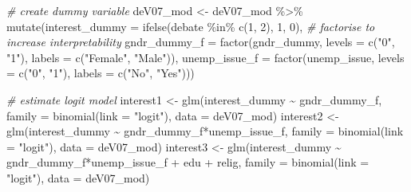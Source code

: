 \documentclass[
]{article}
\newenvironment{Shaded}{\begin{snugshade}}{\end{snugshade}}
\newcommand{\AttributeTok}[1]{\textcolor[rgb]{0.77,0.63,0.00}{#1}}
\newcommand{\CommentTok}[1]{\textcolor[rgb]{0.56,0.35,0.01}{\textit{#1}}}
\newcommand{\DecValTok}[1]{\textcolor[rgb]{0.00,0.00,0.81}{#1}}
\newcommand{\FunctionTok}[1]{\textcolor[rgb]{0.00,0.00,0.00}{#1}}
\newcommand{\NormalTok}[1]{#1}
\newcommand{\OtherTok}[1]{\textcolor[rgb]{0.56,0.35,0.01}{#1}}
\newcommand{\SpecialCharTok}[1]{\textcolor[rgb]{0.00,0.00,0.00}{#1}}
\newcommand{\StringTok}[1]{\textcolor[rgb]{0.31,0.60,0.02}{#1}}
\begin{document}
\begin{Shaded}
\begin{Highlighting}[]
\CommentTok{\# create dummy variable }
\NormalTok{deV07\_mod }\OtherTok{\textless{}{-}}\NormalTok{ deV07\_mod }\SpecialCharTok{\%\textgreater{}\%}
  \FunctionTok{mutate}\NormalTok{(}\AttributeTok{interest\_dummy =} \FunctionTok{ifelse}\NormalTok{(debate }\SpecialCharTok{\%in\%} \FunctionTok{c}\NormalTok{(}\DecValTok{1}\NormalTok{, }\DecValTok{2}\NormalTok{), }\DecValTok{1}\NormalTok{, }\DecValTok{0}\NormalTok{),}
         \CommentTok{\# factorise to increase interpretability}
         \AttributeTok{gndr\_dummy\_f =} \FunctionTok{factor}\NormalTok{(gndr\_dummy, }
                               \AttributeTok{levels =} \FunctionTok{c}\NormalTok{(}\StringTok{"0"}\NormalTok{, }\StringTok{"1"}\NormalTok{), }
                               \AttributeTok{labels =} \FunctionTok{c}\NormalTok{(}\StringTok{"Female"}\NormalTok{, }\StringTok{"Male"}\NormalTok{)), }
         \AttributeTok{unemp\_issue\_f =} \FunctionTok{factor}\NormalTok{(unemp\_issue,}
                               \AttributeTok{levels =} \FunctionTok{c}\NormalTok{(}\StringTok{"0"}\NormalTok{, }\StringTok{"1"}\NormalTok{), }
                               \AttributeTok{labels =} \FunctionTok{c}\NormalTok{(}\StringTok{"No"}\NormalTok{, }\StringTok{"Yes"}\NormalTok{)))}

\CommentTok{\# estimate logit model }
\NormalTok{interest1 }\OtherTok{\textless{}{-}} \FunctionTok{glm}\NormalTok{(interest\_dummy }\SpecialCharTok{\textasciitilde{}}\NormalTok{ gndr\_dummy\_f, }
                 \AttributeTok{family =} \FunctionTok{binomial}\NormalTok{(}\AttributeTok{link =} \StringTok{"logit"}\NormalTok{), }
                 \AttributeTok{data =}\NormalTok{ deV07\_mod)}
\NormalTok{interest2 }\OtherTok{\textless{}{-}} \FunctionTok{glm}\NormalTok{(interest\_dummy }\SpecialCharTok{\textasciitilde{}}\NormalTok{ gndr\_dummy\_f}\SpecialCharTok{*}\NormalTok{unemp\_issue\_f, }
                 \AttributeTok{family =} \FunctionTok{binomial}\NormalTok{(}\AttributeTok{link =} \StringTok{"logit"}\NormalTok{), }
                 \AttributeTok{data =}\NormalTok{ deV07\_mod)}
\NormalTok{interest3 }\OtherTok{\textless{}{-}} \FunctionTok{glm}\NormalTok{(interest\_dummy }\SpecialCharTok{\textasciitilde{}}\NormalTok{ gndr\_dummy\_f}\SpecialCharTok{*}\NormalTok{unemp\_issue\_f }\SpecialCharTok{+}\NormalTok{ edu }\SpecialCharTok{+}\NormalTok{ relig, }
                 \AttributeTok{family =} \FunctionTok{binomial}\NormalTok{(}\AttributeTok{link =} \StringTok{"logit"}\NormalTok{), }
                 \AttributeTok{data =}\NormalTok{ deV07\_mod)}


\end{Highlighting}
\end{Shaded}
\end{document}
